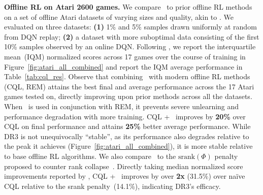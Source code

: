 \textbf{{Offline RL on Atari 2600 games.}} We compare \drmethodname\ to prior offline RL methods on a set of offline Atari datasets of varying sizes and quality, akin to \citet{agarwal2019optimistic, kumar2021implicit}. We evaluated on three datasets: \textbf{(1)} 1\% and 5\% samples drawn uniformly at random from DQN replay; \textbf{(2)} a dataset with more suboptimal data consisting of the first 10\% samples observed by an online DQN. Following \citet{agarwal2021precipice}, we report the interquartile mean~(IQM) normalized scores across 17 games over the course of training in Figure~\ref{fig:atari_all_combined} and report the IQM average performance in Table~\ref{tab:cql_res}. Observe that combining \drmethodname\ with modern offline RL methods (CQL, REM) attains the best final and average performance across the 17 Atari games tested on, directly improving upon prior methods
across all the datasets. When \drmethodname\ is used in conjunction with REM, it prevents {severe} unlearning and performance degradation with more training. CQL + \drmethodname\ improves by \textbf{20\%} over CQL on final performance and attains \textbf{25\%} better average performance. {While DR3 is not unequivocally ``stable'', as its performance also degrades relative to the peak it achieves (Figure~\ref{fig:atari_all_combined}), it is more stable relative to base offline RL algorithms.} We also compare \drmethodname\ to the $\mathrm{srank}(\Phi)$ penalty proposed to counter rank collapse~\citep{kumar2021implicit}. Directly taking median normalized score improvements reported by \citet{kumar2021implicit}, CQL + \drmethodname\ improves by over \textbf{2x} (31.5\%) over na\"ive CQL relative to the srank penalty~(14.1\%), indicating DR3's efficacy.
